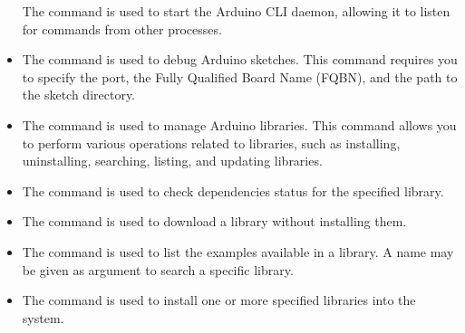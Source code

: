 \begin{itemize}
	The command  is used to start the Arduino CLI daemon, allowing it to listen for commands from other processes.
	
	
	\item {}
	
	The command  is used to debug Arduino sketches. This command requires you to specify the port, the Fully Qualified Board Name (FQBN), and the path to the sketch directory.
	
	
	\item {}
	
	The command  is used to manage Arduino libraries. This command allows you to perform various operations related to libraries, such as installing, uninstalling, searching, listing, and updating libraries.
	
	
	\item {}
	
	The command  is used to check dependencies status for the specified library.
	
	
	\item {}
	
	The command  is used to download a library without installing them.
	
	
	\item {}
	
	The command  is used to list the examples available in a library. A name may be given as argument to search a specific library.
	
	
	\item {}
	
	The command  is used to install one or more specified libraries into the system.
	
	

\end{itemize}
